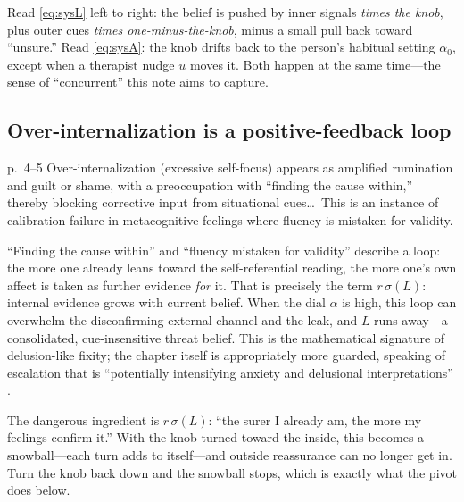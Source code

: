 \documentclass[11pt]{article}
\newcommand{\sig}{\sigma}
\begin{document}
\begin{plainbox}
Read \eqref{eq:sysL} left to right: the belief is pushed by inner signals \emph{times the knob}, plus outer cues \emph{times one-minus-the-knob}, minus a small pull back toward ``unsure.'' Read \eqref{eq:sysA}: the knob drifts back to the person's habitual setting $\alpha_0$, except when a therapist nudge $u$ moves it. Both happen at the same time---the sense of ``concurrent'' this note aims to capture.
\end{plainbox}

\subsection{Over-internalization is a positive-feedback loop}
\label{sec:overint}

\begin{fromtext}{p.~4--5}
Over-internalization (excessive self-focus) appears as amplified rumination and guilt or shame, with a preoccupation with ``finding the cause within,'' thereby blocking corrective input from situational cues\dots\ This is an instance of calibration failure in metacognitive feelings where fluency is mistaken for validity.
\end{fromtext}

\noindent ``Finding the cause within'' and ``fluency mistaken for validity'' describe a loop: the more one already leans toward the self-referential reading, the more one's own affect is taken as further evidence \emph{for} it. That is precisely the term $r\,\sig(L)$: internal evidence grows with current belief. When the dial $\alpha$ is high, this loop can overwhelm the disconfirming external channel and the leak, and $L$ runs away---a consolidated, cue-insensitive threat belief. This is the mathematical signature of delusion-like fixity; the chapter itself is appropriately more guarded, speaking of escalation that is ``potentially intensifying anxiety and delusional interpretations'' \citep[p.~5]{HanEtAL2025}.

\begin{plainbox}
The dangerous ingredient is $r\,\sig(L)$: ``the surer I already am, the more my feelings confirm it.'' With the knob turned toward the inside, this becomes a snowball---each turn adds to itself---and outside reassurance can no longer get in. Turn the knob back down and the snowball stops, which is exactly what the pivot does below.
\end{plainbox}
\end{document}
